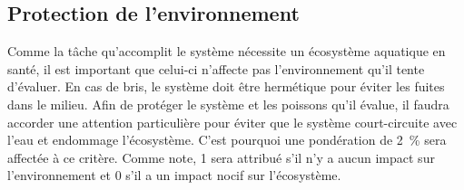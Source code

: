 

\subsection{Protection de l’environnement}
\label{s:cdc_sec_protenv}

Comme la tâche qu’accomplit le système nécessite un écosystème aquatique en santé, il est important que celui-ci n’affecte pas l’environnement qu’il tente d’évaluer.
En cas de bris, le système doit être hermétique pour éviter les fuites dans le milieu.
Afin de protéger le système et les poissons qu’il évalue, il faudra accorder une attention particulière pour éviter que le système court-circuite avec l’eau et endommage l’écosystème.
C’est pourquoi une pondération de 2~\% sera affectée à ce critère.
Comme note, 1 sera attribué s’il n’y a aucun impact sur l’environnement et 0 s’il a un impact nocif sur l’écosystème.